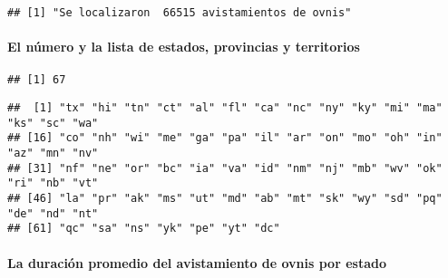 \documentclass[]{article}
\newenvironment{Shaded}{\begin{snugshade}}{\end{snugshade}}
\newcommand{\KeywordTok}[1]{\textcolor[rgb]{0.13,0.29,0.53}{\textbf{#1}}}
\newcommand{\DataTypeTok}[1]{\textcolor[rgb]{0.13,0.29,0.53}{#1}}
\newcommand{\StringTok}[1]{\textcolor[rgb]{0.31,0.60,0.02}{#1}}
\newcommand{\OperatorTok}[1]{\textcolor[rgb]{0.81,0.36,0.00}{\textbf{#1}}}
\newcommand{\NormalTok}[1]{#1}
\let\oldparagraph\paragraph
\renewcommand{\paragraph}[1]{\oldparagraph{#1}\mbox{}}
\begin{document}
\begin{verbatim}
## [1] "Se localizaron  66515 avistamientos de ovnis"
\end{verbatim}

\paragraph{El número y la lista de estados, provincias y
territorios}\label{el-nuxfamero-y-la-lista-de-estados-provincias-y-territorios}

\begin{Shaded}
\end{Shaded}

\begin{verbatim}
## [1] 67
\end{verbatim}

\begin{Shaded}
\end{Shaded}

\begin{verbatim}
##  [1] "tx" "hi" "tn" "ct" "al" "fl" "ca" "nc" "ny" "ky" "mi" "ma" "ks" "sc" "wa"
## [16] "co" "nh" "wi" "me" "ga" "pa" "il" "ar" "on" "mo" "oh" "in" "az" "mn" "nv"
## [31] "nf" "ne" "or" "bc" "ia" "va" "id" "nm" "nj" "mb" "wv" "ok" "ri" "nb" "vt"
## [46] "la" "pr" "ak" "ms" "ut" "md" "ab" "mt" "sk" "wy" "sd" "pq" "de" "nd" "nt"
## [61] "qc" "sa" "ns" "yk" "pe" "yt" "dc"
\end{verbatim}

\paragraph{La duración promedio del avistamiento de ovnis por
estado}\label{la-duraciuxf3n-promedio-del-avistamiento-de-ovnis-por-estado}

\begin{Shaded}
\end{Shaded}
\end{document}
